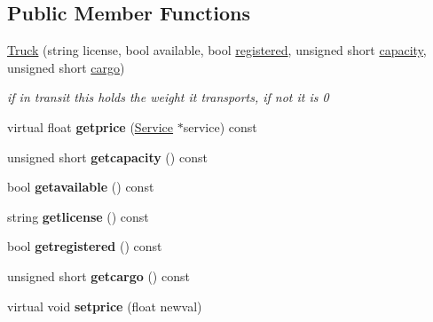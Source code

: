 \subsection*{Public Member Functions}
\begin{DoxyCompactItemize}
\item 
\mbox{\label{class_truck_a310563b5c12feb94c1e1f8f855c1ee05}} 
\hyperlink{class_truck_a310563b5c12feb94c1e1f8f855c1ee05}{Truck} (string license, bool available, bool \hyperlink{class_truck_a80b8405cf7a15b236fef70116f99c4fb}{registered}, unsigned short \hyperlink{class_truck_a14541fad6d47c606ce4e1bd150a68a23}{capacity}, unsigned short \hyperlink{class_truck_a968fc6b1a6171a03e4254d6615da4ecd}{cargo})
\begin{DoxyCompactList}\small\item\em if in transit this holds the weight it transports, if not it is 0 \end{DoxyCompactList}\item 
\mbox{\label{class_truck_a2f11c2039060bcc94ce5d6784035f1bc}} 
virtual float {\bfseries getprice} (\hyperlink{class_service}{Service} $\ast$service) const
\item 
\mbox{\label{class_truck_ad775a01ae4cb8c36d6e2438f4dd37792}} 
unsigned short {\bfseries getcapacity} () const
\item 
\mbox{\label{class_truck_a0eaa329bc72bf0171f7ec2a0a6240156}} 
bool {\bfseries getavailable} () const
\item 
\mbox{\label{class_truck_ae76a7ae2343557680ae915c6c6d42ff8}} 
string {\bfseries getlicense} () const
\item 
\mbox{\label{class_truck_a830838ed22465cf27f56b911c3fadf13}} 
bool {\bfseries getregistered} () const
\item 
\mbox{\label{class_truck_a1bc18daed6fb7f0b900dac32013a250f}} 
unsigned short {\bfseries getcargo} () const
\item 
\mbox{\label{class_truck_a22d2dc22b1c5b9652d463ec624442403}} 
virtual void {\bfseries setprice} (float newval)
\item 
\mbox{\label{class_truck_a9268e17e1a967d1702b28c6940403aa4}} 

\end{DoxyCompactItemize}
